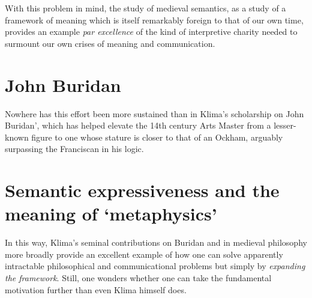 \documentclass[]{article}
\begin{document}
With this problem in mind, the study of medieval semantics, 
as a study of a framework of meaning which is itself remarkably foreign to that of our own time, 
provides an example \emph{par excellence} of the kind of interpretive charity needed to surmount our own crises of meaning and communication. 
\section{John Buridan}
Nowhere has this effort been more sustained than in Klima's scholarship on John Buridan', 
which has helped elevate the 14th century Arts Master from a lesser-known figure to one whose stature is closer to that of an Ockham, 
arguably surpassing the Franciscan in his logic.

\section{Semantic expressiveness and the meaning of `metaphysics'}
In this way, 
Klima's seminal contributions on Buridan and in medieval philosophy more broadly provide an excellent example of how one can solve apparently intractable philosophical and communicational problems 
but simply by \emph{expanding the framework}.
Still, one wonders whether one can take the fundamental motivation further than even Klima himself does. 
\end{document}
